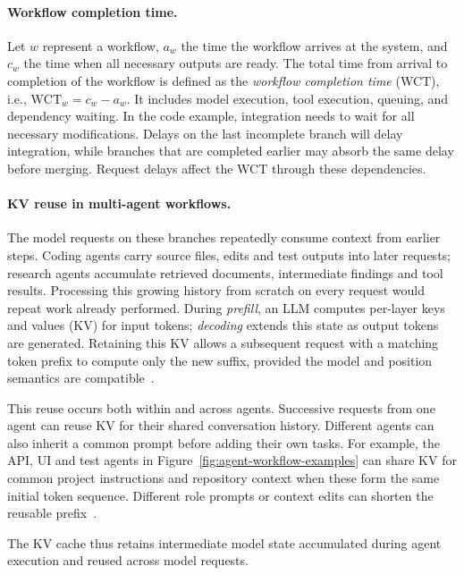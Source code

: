 \paragraph{Workflow completion time.}
Let $w$ represent a workflow, $a_w$ the time the workflow arrives at the system, and $c_w$ the time when all necessary outputs are ready. The total time from arrival to completion of the workflow is defined as the \emph{workflow completion time} (WCT), i.e., $\mathrm{WCT}_w=c_w-a_w$. It includes model execution, tool execution, queuing, and dependency waiting. In the code example, integration needs to wait for all necessary modifications. Delays on the last incomplete branch will delay integration, while branches that are completed earlier may absorb the same delay before merging. Request delays affect the WCT through these dependencies.

\paragraph{KV reuse in multi-agent workflows.}
The model requests on these branches repeatedly consume context from
earlier steps. Coding agents carry source files, edits and test outputs
into later requests; research agents accumulate retrieved documents,
intermediate findings and tool results. Processing this growing history
from scratch on every request would repeat work already performed.
During \emph{prefill}, an LLM computes per-layer keys and values (KV)
for input tokens; \emph{decoding} extends this state as output tokens
are generated. Retaining this KV allows a subsequent request with a
matching token prefix to compute only the new suffix, provided the model
and position semantics are compatible~\cite{gao2024cachedattention,zheng2024sglang}.

This reuse occurs both within and across agents. Successive requests
from one agent can reuse KV for their shared conversation history.
Different agents can also inherit a common prompt before adding their
own tasks. For example, the API, UI and test agents in
Figure~\ref{fig:agent-workflow-examples} can share KV for common project
instructions and repository context when these form the same initial
token sequence. Different role prompts or context edits can shorten
the reusable prefix~\cite{zheng2024sglang}.

The KV cache thus retains intermediate model state accumulated during agent execution and reused across model requests.

